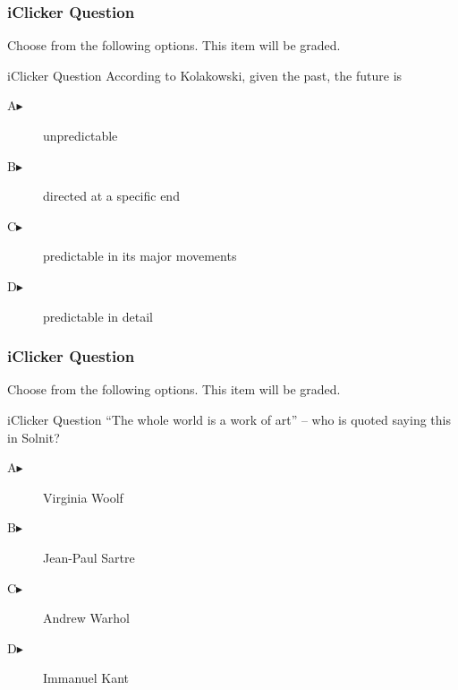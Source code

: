 \documentclass[xcolor=dvipsnames]{beamer}
\begin{document}
\begin{frame}
  \frametitle{iClicker Question}
Choose from the following options. This item will be graded.
\begin{block}{iClicker Question}
According to Kolakowski, given the past, the future is
\end{block}
\begin{description}
\item[A\hspace{.2in}$\blacktriangleright$] unpredictable
\item[B\hspace{.2in}$\blacktriangleright$] directed at a specific end
\item[C\hspace{.2in}$\blacktriangleright$] predictable in its major movements
\item[D\hspace{.2in}$\blacktriangleright$] predictable in detail
\end{description}
\end{frame}

\begin{frame}
  \frametitle{iClicker Question}
Choose from the following options. This item will be graded.
\begin{block}{iClicker Question}
``The whole world is a work of art'' -- who is quoted saying this in Solnit?
\end{block}
\begin{description}
\item[A\hspace{.2in}$\blacktriangleright$] Virginia Woolf
\item[B\hspace{.2in}$\blacktriangleright$] Jean-Paul Sartre
\item[C\hspace{.2in}$\blacktriangleright$] Andrew Warhol
\item[D\hspace{.2in}$\blacktriangleright$] Immanuel Kant
\end{description}
\end{frame}
\end{document}
